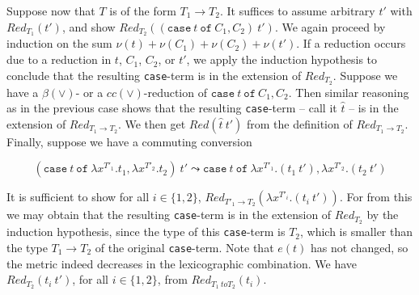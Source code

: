 \documentclass{article}
\newcommand{\red}[0]{\textit{Red}}
\begin{document}
Suppose now that $T$ is of the form $T_1\to T_2$.  It suffices to
assume arbitrary $t'$ with $\red_{T_1}(t')$, and show
$\red_{T_2}((\texttt{case}\ t\ \texttt{of}\ C_1,C_2)\ t')$.  We again
proceed by induction on the sum $\nu(t)+\nu(C_1)+\nu(C_2)+\nu(t')$.
If a reduction occurs due to a reduction in $t$, $C_1$, $C_2$, or
$t'$, we apply the induction hypothesis to conclude that the resulting
\texttt{case}-term is in the extension of $\red_{T_2}$.  Suppose we
have a $\beta(\vee)$- or a $\textit{cc}(\vee)$-reduction of
$\texttt{case}\ t\ \texttt{of}\ C_1,C_2$.  Then similar reasoning as
in the previous case shows that the resulting \texttt{case}-term --
call it $\hat{t}$ -- is in the extension of $\red_{T_1\to T_2}$.  We
then get $\red(\hat{t}\ t')$ from the definition of $\red_{T_1\to
T_2}$.  Finally, suppose we have a commuting conversion

\[
(\texttt{case}\ t\ \texttt{of}\ \lambda x^{T'_1}.t_1,\lambda x^{T'_2}.t_2)\ t' \leadsto 
  \texttt{case}\ t\ \texttt{of}\ \lambda x^{T'_1}.(t_1\ t'), \lambda x^{T'_2}.(t_2\ t') 
\]

\noindent It is sufficient to show for all $i\in\{1,2\}$, $\red_{T'_1
\to T_2}(\lambda x^{T'_i}.(t_i\ t'))$.  For from this we may obtain
that the resulting \texttt{case}-term is in the extension of
$\red_{T_2}$ by the induction hypothesis, since the type of this
\texttt{case}-term is $T_2$, which is smaller than the type $T_1\to
T_2$ of the original \texttt{case}-term.  Note that $e(t)$ has not
changed, so the metric indeed decreases in the lexicographic
combination.  We have $\red_{T_2}(t_i\ t')$, for all $i\in\{1,2\}$,
from $\red_{T_1\ to T_2}(t_i)$.  







\end{document}
